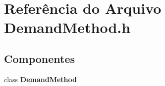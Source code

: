 \section{Referência do Arquivo Demand\+Method.\+h}
\label{_demand_method_8h}
\subsection*{Componentes}
\begin{DoxyCompactItemize}
\item 
class {\bf Demand\+Method}
\end{DoxyCompactItemize}

